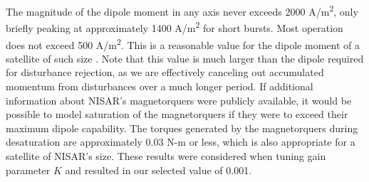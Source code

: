 The magnitude of the dipole moment in any axis never exceeds 2000 A/m\textsuperscript{2}, only briefly peaking at approximately 1400 A/m\textsuperscript{2} for short bursts. Most operation does not exceed 500 A/m\textsuperscript{2}. This is a reasonable value for the dipole moment of a satellite of such size \cite{gibson1971low}. Note that this value is much larger than the dipole required for disturbance rejection, as we are effectively canceling out accumulated momentum from disturbances over a much longer period. If additional information about NISAR's magnetorquers were publicly available, it would be possible to model saturation of the magnetorquers if they were to exceed their maximum dipole capability. The torques generated by the magnetorquers during desaturation are approximately 0.03 N-m or less, which is also appropriate for a satellite of NISAR's size. These results were considered when tuning gain parameter $K$ and resulted in our selected value of 0.001.